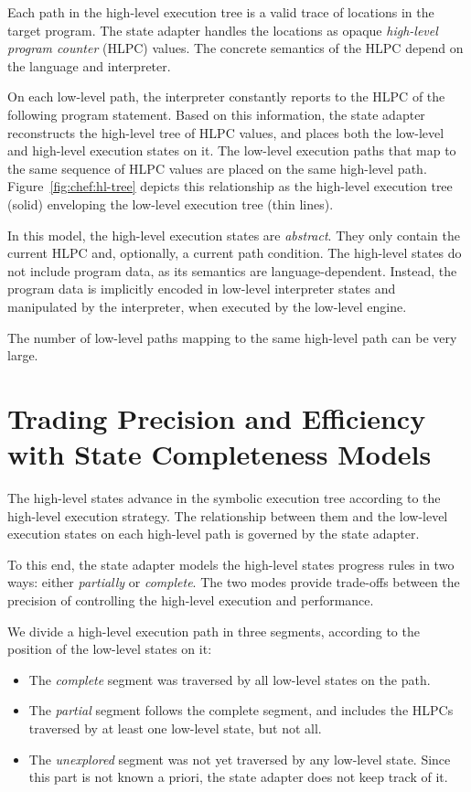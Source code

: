 Each path in the high-level execution tree is a valid trace of locations in the target program.
%
The state adapter handles the locations as opaque \emph{high-level program counter} (HLPC) values.  The concrete semantics of the HLPC depend on the language and interpreter.

On each low-level path, the interpreter constantly reports to \chef the HLPC of the following program statement.
%
Based on this information, the state adapter reconstructs the high-level tree of HLPC values, and places both the low-level and high-level execution states on it.
%
The low-level execution paths that map to the same sequence of HLPC values are placed on the same high-level path.
%
Figure~\ref{fig:chef:hl-tree} depicts this relationship as the high-level execution tree (solid) enveloping the low-level execution tree (thin lines).

In this model, the high-level execution states are \emph{abstract}.
%
They only contain the current HLPC and, optionally, a current path condition.
%
The high-level states do not include program data, as its semantics are language-dependent.  Instead, the program data is implicitly encoded in low-level interpreter states and manipulated by the interpreter, when executed by the low-level engine.

The number of low-level paths mapping to the same high-level path can be very large.


\section{Trading Precision and Efficiency with State Completeness Models}

The high-level states advance in the symbolic execution tree according to the high-level execution strategy.
%
The relationship between them and the low-level execution states on each high-level path is governed by the state adapter.

To this end, the state adapter models the high-level states progress rules in two ways: either \emph{partially} or \emph{complete}.
%
The two modes provide trade-offs between the precision of controlling the high-level execution and performance.

We divide a high-level execution path in three segments, according to the position of the low-level states on it:
\begin{itemize}
\item The \emph{complete} segment was traversed by all low-level states on the path.
\item The \emph{partial} segment follows the complete segment, and includes the HLPCs traversed by at least one low-level state, but not all.
\item The \emph{unexplored} segment was not yet traversed by any low-level state.  Since this part is not known a priori, the state adapter does not keep track of it.
\end{itemize}

